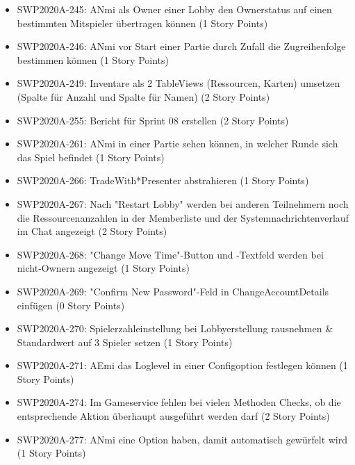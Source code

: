 \documentclass[12pt,a4paper, oneside]{article}
\begin{document}
\begin{itemize}
        \item SWP2020A-245:	ANmi als Owner einer Lobby den Ownerstatus auf einen bestimmten Mitspieler übertragen können (1 Story Points)

        \item SWP2020A-246:	ANmi vor Start einer Partie durch Zufall die Zugreihenfolge bestimmen können (1 Story Points)

        \item SWP2020A-249:	Inventare als 2 TableViews (Ressourcen, Karten) umsetzen (Spalte für Anzahl und Spalte für Namen) (2 Story Points)

        \item SWP2020A-255:	Bericht für Sprint 08 erstellen (2 Story Points)

        \item SWP2020A-261:	ANmi in einer Partie sehen können, in welcher Runde sich das Spiel befindet (1 Story Points)

        \item SWP2020A-266:	TradeWith*Presenter abstrahieren (1 Story Points)

        \item SWP2020A-267:	Nach "Restart Lobby" werden bei anderen Teilnehmern noch die Ressourcenanzahlen in der Memberliste und der Systemnachrichtenverlauf im Chat angezeigt (2 Story Points)

        \item SWP2020A-268:	"Change Move Time"-Button und -Textfeld werden bei nicht-Ownern angezeigt (1 Story Points)

        \item SWP2020A-269:	"Confirm New Password"-Feld in ChangeAccountDetails einfügen (0 Story Points)

        \item SWP2020A-270:	Spielerzahleinstellung bei Lobbyerstellung rausnehmen & Standardwert auf 3 Spieler setzen (1 Story Points)

        \item SWP2020A-271:	AEmi das Loglevel in einer Configoption festlegen können (1 Story Points)

        \item SWP2020A-274:	Im Gameservice fehlen bei vielen Methoden Checks, ob die entsprechende Aktion überhaupt ausgeführt werden darf (2 Story Points)

        \item SWP2020A-277:	ANmi eine Option haben, damit automatisch gewürfelt wird (1 Story Points)


\end{itemize}
\end{document}
